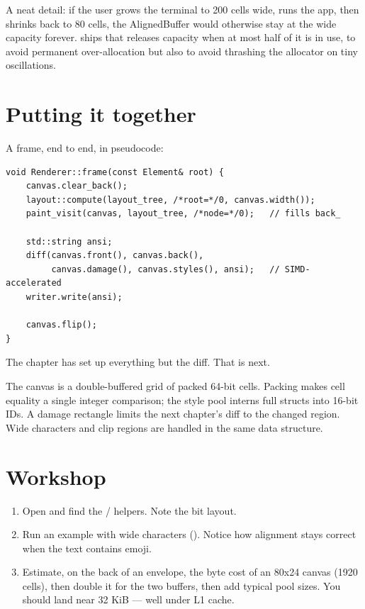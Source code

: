 A neat detail: if the user grows the terminal to 200 cells wide, runs
the app, then shrinks back to 80 cells, the AlignedBuffer would
otherwise stay at the wide capacity forever. \maya{} ships
 that releases capacity when at
most half of it is in use, to avoid permanent over-allocation but
also to avoid thrashing the allocator on tiny oscillations.

\section{Putting it together}

A frame, end to end, in pseudocode:

\begin{lstlisting}
void Renderer::frame(const Element& root) {
    canvas.clear_back();
    layout::compute(layout_tree, /*root=*/0, canvas.width());
    paint_visit(canvas, layout_tree, /*node=*/0);   // fills back_

    std::string ansi;
    diff(canvas.front(), canvas.back(),
         canvas.damage(), canvas.styles(), ansi);   // SIMD-accelerated
    writer.write(ansi);

    canvas.flip();
}
\end{lstlisting}

The chapter has set up everything but the diff. That is next.

\begin{recap}
The canvas is a double-buffered grid of packed 64-bit cells.
Packing makes cell equality a single integer comparison; the style
pool interns full  structs into 16-bit IDs. A damage
rectangle limits the next chapter's diff to the changed region.
Wide characters and clip regions are handled in the same data
structure.
\end{recap}

\section*{Workshop}

\begin{enumerate}[leftmargin=*]
  \item Open  and find the
     /  helpers. Note the bit layout.
  \item Run an example with wide characters
    (). Notice how alignment stays
    correct when the text contains emoji.
  \item Estimate, on the back of an envelope, the byte cost of an
    80x24 canvas (1920 cells), then double it for the two buffers,
    then add typical pool sizes. You should land near 32 KiB ---
    well under L1 cache.
\end{enumerate}
